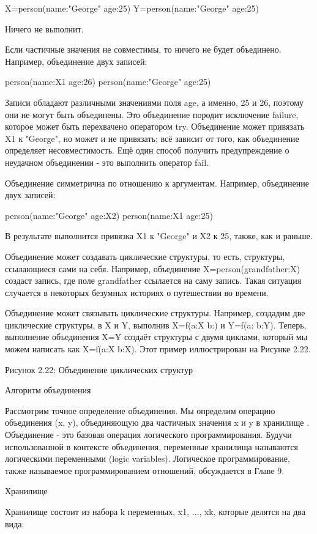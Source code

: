 X=person(name:"George" age:25)
Y=person(name:"George" age:25)

Ничего не выполнит.

Если частичные значения не совместимы, то ничего не будет объединено. Например, объединение двух записей:

person(name:X1 age:26)
person(name:"George" age:25)

Записи обладают различными значениями поля age, а именно, 25 и 26, поэтому они не могут быть объединены. Это объединение породит исключение failure, которое может быть перехвачено оператором try. Объединение может привязать X1 к "George", но может и не привязать; всё зависит от того, как объединение определяет несовместимость. Ещё один способ получить предупреждение о неудачном объединении - это выполнить оператор fail.

Объединение симметрична по отношению к аргументам. Например, объединение двух записей:

person(name:"George" age:X2)
person(name:X1 age:25)

В результате выполнится привязка X1 к "George" и X2 к 25, также, как и раньше.

Объединение может создавать циклические структуры, то есть, структуры, ссылающиеся сами на себя. Например, объединение X=person(grandfather:X) создаст запись, где поле grandfather ссылается на саму запись. Такая ситуация случается в некоторых безумных историях о путешествии во времени.

Объединение может связывать циклические структуры. Например, создадим две циклические структуры, в X и Y, выполнив X=f(a:X b:) и Y=f(a: b:Y). Теперь, выполнение объединения X=Y создаёт структуры с двумя циклами, который мы можем написать как X=f(a:X b:X). Этот пример иллюстрирован на Рисунке 2.22.

Рисунок 2.22: Объединение циклических структур

Алгоритм объединения

Рассмотрим точное определение объединения. Мы определим операцию объединения (x, y), объединяющую два частичных значения x и y в хранилище . Объединение - это базовая операция логического программирования. Будучи использованной в контексте объединения, переменные хранилища называются логическими переменными (logic variables). Логическое программирование, также называемое программированием отношений, обсуждается в Главе 9.

Хранилище

Хранилище состоит из набора k переменных, x1, ..., xk, которые делятся на два вида:

